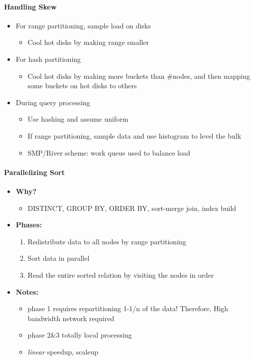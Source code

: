 \paragraph{Handling Skew}
\begin{itemize}
\item For range partitioning, sample load on disks
  \begin{itemize}
  \item Cool hot disks by making range smaller
  \end{itemize}

\item For hash partitioning
  \begin{itemize}
  \item Cool hot disks by making more buckets than \#nodes,
    and then mapping some buckets on hot disks to others
  \end{itemize}

\item During query processing
  \begin{itemize}
  \item Use hashing and assume uniform
  \item If range partitioning, sample data and use histogram to
    level the bulk
  \item SMP/River scheme: work queue used to balance load
  \end{itemize}
\end{itemize}


\paragraph{Parallelizing Sort}
\begin{itemize}
\item \textbf{Why?}
  \begin{itemize}
  \item DISTINCT, GROUP BY, ORDER BY, sort-merge join, index build
  \end{itemize}

\item \textbf{Phases:}
  \begin{enumerate}
  \item Redistribute data to all nodes by range partitioning
  \item Sort data in parallel
  \item Read the entire sorted relation by visiting the nodes
    in order
  \end{enumerate}

\item \textbf{Notes:}
  \begin{itemize}
  \item phase 1 requires repartitioning 1-1/n of the data! Therefore,
    High bandwidth network required
  \item phase 2\&3 totally local processing
  \item \textit{linear} speedup, scaleup
  \end{itemize}
\end{itemize}



